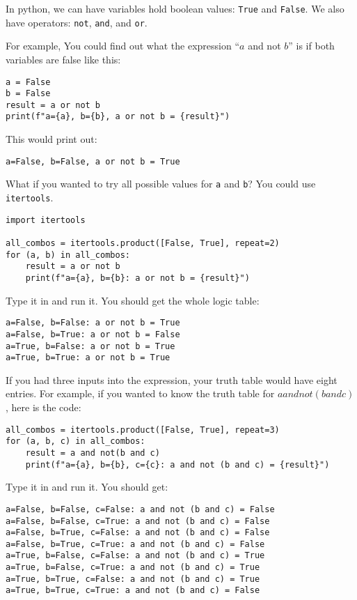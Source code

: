 In python, we can have variables hold boolean values: \texttt{True}
and \texttt{False}.  We also have operators: \texttt{not},
\texttt{and}, and \texttt{or}.

For example, You could find out what the expression ``$a$ and not
$b$'' is if both variables are false like this:
\begin{verbatim}
a = False
b = False
result = a or not b
print(f"a={a}, b={b}, a or not b = {result}")
\end{verbatim}

This would print out:
\begin{verbatim}
a=False, b=False, a or not b = True
\end{verbatim}

What if you wanted to try all possible values for \texttt{a} and
\texttt{b}? You could use \texttt{itertools}.

\begin{verbatim}
import itertools

all_combos = itertools.product([False, True], repeat=2)
for (a, b) in all_combos:
    result = a or not b
    print(f"a={a}, b={b}: a or not b = {result}")       
\end{verbatim}

Type it in and run it. You should get the whole logic table:

\begin{verbatim}
a=False, b=False: a or not b = True
a=False, b=True: a or not b = False
a=True, b=False: a or not b = True
a=True, b=True: a or not b = True
\end{verbatim}

If you had three inputs into the expression, your truth table would
have eight entries.  For example, if you wanted to know the truth
table for $a and not(b and c)$, here is the code:

\begin{verbatim}
all_combos = itertools.product([False, True], repeat=3)
for (a, b, c) in all_combos:
    result = a and not(b and c)
    print(f"a={a}, b={b}, c={c}: a and not (b and c) = {result}")
\end{verbatim}

Type it in and run it. You should get:

\begin{verbatim}
a=False, b=False, c=False: a and not (b and c) = False
a=False, b=False, c=True: a and not (b and c) = False
a=False, b=True, c=False: a and not (b and c) = False
a=False, b=True, c=True: a and not (b and c) = False
a=True, b=False, c=False: a and not (b and c) = True
a=True, b=False, c=True: a and not (b and c) = True
a=True, b=True, c=False: a and not (b and c) = True
a=True, b=True, c=True: a and not (b and c) = False
\end{verbatim}

